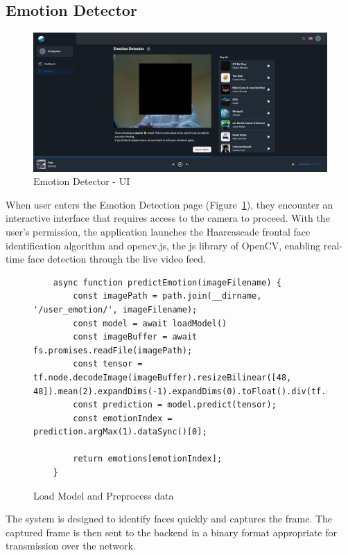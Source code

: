 \subsection{Emotion Detector}
\begin{figure}[h!]
    \centering
    \includegraphics[width=14cm]{Images/emotion-detector.png}
    \caption{Emotion Detector - UI}
    \label{fig:emo-detect}
\end{figure}
When user enters the Emotion Detection page (Figure~\ref{fig:emo-detect}), they encounter an interactive interface that requires access to the camera to proceed.
With the user's permission, the application launches the Haarcascade frontal face identification algorithm and opencv.js, the \gls{js} library of OpenCV, enabling real-time face detection through the live video feed.
\\
\begin{figure}[h!] 
    \centering
\begin{verbatim}
    async function predictEmotion(imageFilename) {
        const imagePath = path.join(__dirname, '/user_emotion/', imageFilename);
        const model = await loadModel()
        const imageBuffer = await fs.promises.readFile(imagePath);
        const tensor = tf.node.decodeImage(imageBuffer).resizeBilinear([48, 48]).mean(2).expandDims(-1).expandDims(0).toFloat().div(tf.scalar(255));
        const prediction = model.predict(tensor);
        const emotionIndex = prediction.argMax(1).dataSync()[0];

        return emotions[emotionIndex];
    }
\end{verbatim}
    \caption{Load Model and Preprocess data}
    \label{fig:load-process}
\end{figure}
\indent The system is designed to identify faces quickly and captures the frame.
The captured frame is then sent to the backend in a binary format appropriate for transmission over the network.
